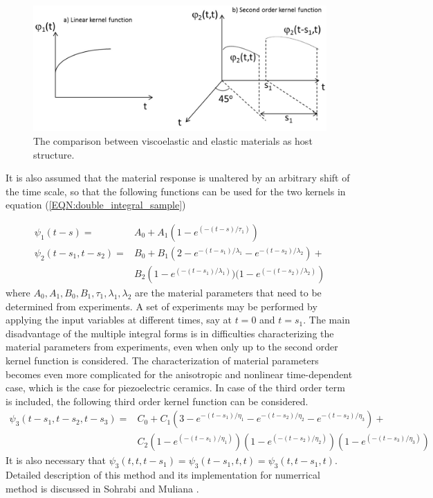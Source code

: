 \begin{figure}
\centering
\includegraphics[width=5.0in]{./chap_3_minor_loop/figures/Time_dependent_kernel_functions.png}
\caption{The comparison between viscoelastic and elastic materials as host structure.}
\label{fig:2.1.Time_dependent_kernel_functions}
\end{figure}
It is also assumed that the material response is unaltered by an arbitrary shift of the time scale, so that
 the following functions can be used for the two kernels in equation (\ref{EQN:double_integral_sample})

\begin{equation}
\begin{aligned}
 \psi_1(t-s)=& A_0+A_1 (1-e^{(-(t-s)/\tau_1)}) \\ 
 \psi_2(t-s_1,t-s_2) = & B_0+B_1 
\left(2-e^{-(t-s_1)/\lambda_1}-e^{-(t-s_2)/\lambda_2}\right)+ \\
& B_2\left(1-e^{(-(t-s_1)/\lambda_1)})(1-e^{(-(t-s_2)/\lambda_2)}\right)  
\end{aligned}
\label{EQN:double_integral_sample_second}
\end{equation}
where $A_0, A_1, B_0, B_1, \tau_1, \lambda_1, \lambda_2$ are the material parameters that need to be determined from experiments.
A set of experiments may be performed by applying the input variables at different times, say at $t=0$ and $t=s_1$.
The main disadvantage of the multiple integral forms is in difficulties characterizing the material parameters from experiments,
 even when only up to the second order kernel function is considered. 
The characterization of material parameters becomes even more complicated for the anisotropic and nonlinear time-dependent case,
 which is the case for piezoelectric ceramics. 
 In case of the third order term is included, the following third order kernel function can be considered.
\begin{equation}
\begin{aligned}
 \psi_3(t-s_1,t-s_2,t-s_3) = & C_0+C_1 
\left(3-e^{-(t-s_1)/\eta_1}-e^{-(t-s_2)/\eta_2}-e^{-(t-s_2)/\eta_3}\right)+ \\
& C_2\left(1-e^{(-(t-s_1)/\eta_1)}\right)  
     \left(1-e^{(-(t-s_2)/\eta_2)}\right)
     \left(1-e^{(-(t-s_3)/\eta_3)}\right)
\end{aligned}
\label{EQN:double_integral_sample_third_order}
\end{equation}
It is also necessary that  $\psi_3(t,t,t-s_1)=\psi_3(t-s_1,t,t)= \psi_3(t,t-s_1,t)$.
Detailed description of this method and its implementation for numerrical method is discussed in Sohrabi and Muliana \cite{Sohrabi2011}.

